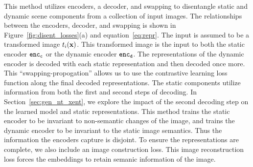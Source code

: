 \documentclass[11pt]{article}
\begin{document}
This method utilizes encoders, a decoder, and swapping to disentangle static and dynamic scene components from a collection of input images. The relationships between the encoders, decoder, and swapping is shown in Figure~\ref{fig:disent_losses}(a) and equation~\ref{eq:repr}. The input is assumed to be a transformed image $t_i(\boldsymbol{\mathrm{x}})$. This transformed image is the input to both the static encoder ${\tt enc_{c}}$ or the dynamic encoder ${\tt enc_{d}}$. The representations of the dynamic encoder is decoded with each static representation and then decoded once more. This ``swapping-propogation'' allows us to use the contrastive learning loss function along the final decoded representations. The static components utilize information from both the first and second steps of decoding. In Section~\ref{sec:gen_nt_xent}, we explore the impact of the second decoding step on the learned model and static representations. This method trains the static encoder to be invariant to non-semantic changes of the image, and trains the dynamic encoder to be invariant to the static image semantics. Thus the information the encoders capture is disjoint. To ensure the representations are complete, we also include an image construction loss. This image reconstruction loss forces the embeddings to retain semanic information of the image.
\end{document}
